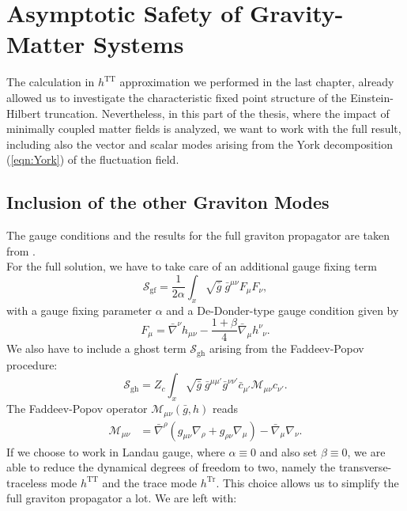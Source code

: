 \chapter{Asymptotic Safety of Gravity-Matter Systems}\label{chap:Matter} 
The calculation in $h^{\mathrm{TT}}$ approximation we performed in the last chapter, already allowed us to investigate the characteristic fixed point structure of the Einstein-Hilbert truncation. Nevertheless, in this part of the thesis, where the impact of minimally coupled matter fields is analyzed, we want to work with the full result, including also the vector and scalar modes arising from the York decomposition (\ref{eqn:York}) of the fluctuation field. 
\section{Inclusion of the other Graviton Modes}
The gauge conditions and the results for the full graviton propagator are taken from \cite{PawlowskiNPgaugeLecture}.\\
For the full solution, we have to take care of an additional gauge fixing term
\begin{equation}
\mathcal{S}_{\mathrm{gf}} = \frac{1}{2\alpha} \int_x \sqrt{\bar{g}} \  \bar{g}^{\mu\nu} F_{\mu}F_{\nu},
\end{equation}
with a gauge fixing parameter $\alpha$ and a De-Donder-type gauge condition given by
\begin{equation}
	F_{\mu} = \bar{\nabla}^{\nu}h_{\mu\nu} - \frac{1+\beta}{4}\bar{\nabla}_{\mu}h^{\nu}_{\phantom{\nu}\nu}. 
\end{equation}
We also have to include a ghost term $\mathcal{S}_{\mathrm{gh}}$ arising from the Faddeev-Popov procedure:
\begin{equation}
\mathcal{S}_{\mathrm{gh}} = Z_c\int_x \sqrt{\bar{g}} \  \bar{g}^{\mu\mu'} \bar{g}^{\nu\nu'}\bar{c}_{\mu'} \mathcal{M}_{\mu\nu}  c_{\nu'}.
\label{eqn:ghost_action}
\end{equation}
 The Faddeev-Popov operator $\mathcal{M}_{\mu\nu}(\bar{g},h)$ reads
\begin{align}
	\mathcal{M}_{\mu\nu} &= \bar{\nabla}^{\rho}(g_{\mu\nu}\nabla_{\rho} + g_{\rho\nu}\nabla_{\mu}) - \bar{\nabla}_{\mu}\nabla_{\nu}.
	\label{eqn:FPop}
\end{align}
If we choose to work in Landau gauge, where $\alpha \equiv 0$ and also set $\beta\equiv 0$, we are able to reduce the dynamical degrees of freedom to two, namely the transverse-traceless mode $h^{\mathrm{TT}}$ and the trace mode $h^{\mathrm{Tr}}$. This choice allows us to simplify the full graviton propagator a lot. We are left with:

